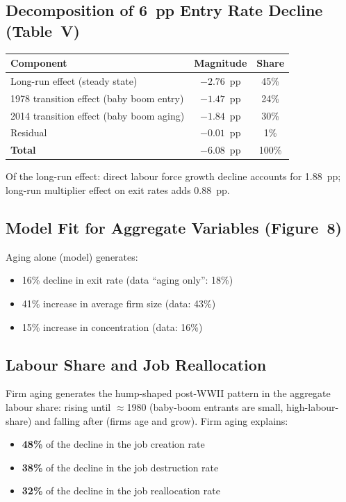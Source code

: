 \subsection*{Decomposition of 6~pp Entry Rate Decline (Table~V)}

\begin{center}
\begin{tabular}{lcc}
\toprule
\textbf{Component} & \textbf{Magnitude} & \textbf{Share} \\
\midrule
Long-run effect (steady state) & $-2.76$~pp & 45\% \\
1978 transition effect (baby boom entry) & $-1.47$~pp & 24\% \\
2014 transition effect (baby boom aging) & $-1.84$~pp & 30\% \\
Residual & $-0.01$~pp & 1\% \\
\midrule
\textbf{Total} & $-6.08$~pp & 100\% \\
\bottomrule
\end{tabular}
\end{center}

Of the long-run effect: direct labour force growth decline accounts for
1.88~pp; long-run multiplier effect on exit rates adds 0.88~pp.

\subsection*{Model Fit for Aggregate Variables (Figure~8)}

Aging alone (model) generates:
\begin{itemize}
  \item 16\% decline in exit rate (data ``aging only'': 18\%)
  \item 41\% increase in average firm size (data: 43\%)
  \item 15\% increase in concentration (data: 16\%)
\end{itemize}

\subsection*{Labour Share and Job Reallocation}

Firm aging generates the hump-shaped post-WWII pattern in the aggregate
labour share: rising until $\approx$1980 (baby-boom entrants are small,
high-labour-share) and falling after (firms age and grow). Firm aging
explains:
\begin{itemize}
  \item \textbf{48\%} of the decline in the job creation rate
  \item \textbf{38\%} of the decline in the job destruction rate
  \item \textbf{32\%} of the decline in the job reallocation rate
\end{itemize}

